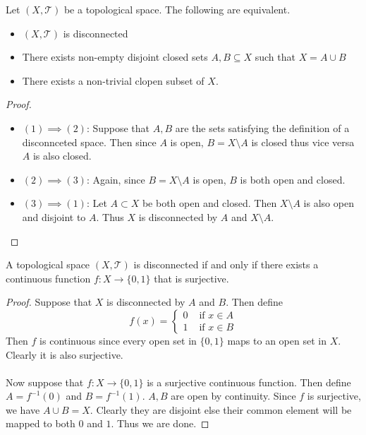 \documentclass[a4paper]{article}
\begin{document}
\begin{prp}{}{} Let $(X,\mathcal{T})$ be a topological space. The following are equivalent. 
\begin{itemize}
\item $(X,\mathcal{T})$ is disconnected
\item There exists non-empty disjoint closed sets $A,B\subseteq X$ such that $X=A\cup B$
\item There exists a non-trivial clopen subset of $X$. 
\end{itemize} \tcbline
\begin{proof}~\\
\begin{itemize}
\item $(1)\implies(2)$: Suppose that $A,B$ are the sets satisfying the definition of a disconnceted space. Then since $A$ is open, $B=X\setminus A$ is closed thus vice versa $A$ is also closed. 
\item $(2)\implies(3)$: Again, since $B=X\setminus A$ is open, $B$ is both open and closed. 
\item $(3)\implies(1)$: Let $A\subset X$ be both open and closed. Then $X\setminus A$ is also open and disjoint to $A$. Thus $X$ is disconnected by $A$ and $X\setminus A$. 
\end{itemize}
\end{proof}
\end{prp}

\begin{prp}{}{} A topological space $(X,\mathcal{T})$ is disconnected if and only if there exists a continuous function $f:X\to\{0,1\}$ that is surjective. \tcbline
\begin{proof}
Suppose that $X$ is disconnected by $A$ and $B$. Then define $$f(x)=\begin{cases}
0 &\text{ if }x\in A\\
1 & \text{ if }x\in B
\end{cases}$$
Then $f$ is continuous since every open set in $\{0,1\}$ maps to an open set in $X$. Clearly it is also surjective. \\~\\
Now suppose that $f:X\to\{0,1\}$ is a surjective continuous function. Then define $A=f^{-1}(0)$ and $B=f^{-1}(1)$. $A,B$ are open by continuity. Since $f$ is surjective, we have $A\cup B=X$. Clearly they are disjoint else their common element will be mapped to both $0$ and $1$. Thus we are done. 
\end{proof}
\end{prp}
\end{document}
